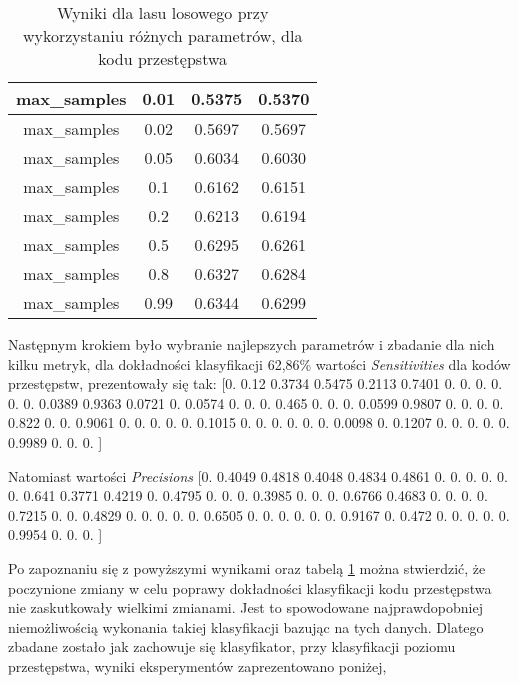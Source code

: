 \documentclass{classrep}
\begin{document}
{{\begin{table}
\begin{tabular}{|c|c|c|c|}
            max\_samples & 0.01 & 0.5375 & 0.5370 \\ \hline
            max\_samples & 0.02 & 0.5697 & 0.5697 \\ \hline
            max\_samples & 0.05 & 0.6034 & 0.6030 \\ \hline
            max\_samples & 0.1 & 0.6162 & 0.6151 \\ \hline
            max\_samples & 0.2 & 0.6213 & 0.6194 \\ \hline
            max\_samples & 0.5 & 0.6295 & 0.6261 \\ \hline
            max\_samples & 0.8 & 0.6327 & 0.6284 \\ \hline
            max\_samples & 0.99 & 0.6344 & 0.6299 \\ \hline

            \hline
    \end{tabular}
    \caption{Wyniki dla lasu losowego przy wykorzystaniu różnych parametrów, dla kodu przestępstwa}
    \label{tab:forest_parameters_keyCode}
\end{table}
                  \FloatBarrier
  
    Następnym krokiem było wybranie najlepszych parametrów i zbadanie dla nich kilku metryk, dla dokładności klasyfikacji 62,86\% wartości \textit{Sensitivities} dla kodów przestępstw, prezentowały się tak:
    [0.     0.12   0.3734 0.5475 0.2113 0.7401 0.     0.     0.     0.
 0.     0.     0.0389 0.9363 0.0721 0.     0.0574 0.     0.     0.
 0.465  0.     0.     0.     0.0599 0.9807 0.     0.     0.     0.
 0.822  0.     0.     0.9061 0.     0.     0.     0.     0.     0.1015
 0.     0.     0.     0.     0.     0.     0.0098 0.     0.1207 0.
 0.     0.     0.     0.     0.9989 0.     0.     0.    ]
   
    Natomiast wartości \textit{Precisions}
    [0.     0.4049 0.4818 0.4048 0.4834 0.4861 0.     0.     0.     0.
 0.     0.     0.641  0.3771 0.4219 0.     0.4795 0.     0.     0.
 0.3985 0.     0.     0.     0.6766 0.4683 0.     0.     0.     0.
 0.7215 0.     0.     0.4829 0.     0.     0.     0.     0.     0.6505
 0.     0.     0.     0.     0.     0.     0.9167 0.     0.472  0.
 0.     0.     0.     0.     0.9954 0.     0.     0.    ]
    
    
    Po zapoznaniu się z powyższymi wynikami oraz tabelą \ref{tab:forest_parameters_keyCode} można stwierdzić, że poczynione zmiany w celu poprawy dokładności klasyfikacji kodu przestępstwa nie zaskutkowały wielkimi zmianami. Jest to spowodowane najprawdopobniej niemożliwością wykonania takiej klasyfikacji bazując na tych danych. Dlatego zbadane zostało jak zachowuje się klasyfikator, przy klasyfikacji poziomu przestępstwa, wyniki eksperymentów zaprezentowano poniżej,
    
}}
\end{document}

